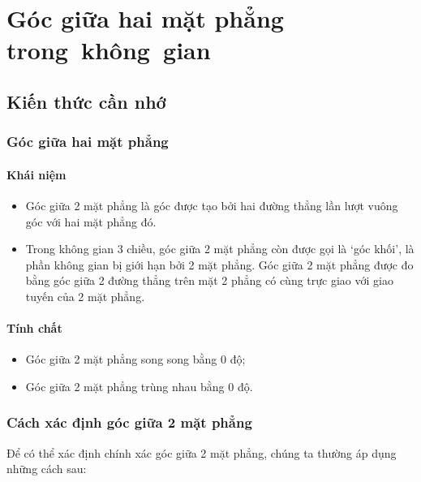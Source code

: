 \setcounter{section}{29}
\setcounter{ex}{0}
\section{Góc giữa hai mặt phẳng trong~không~gian}
\subsection{Kiến thức cần nhớ}
\begin{khung}
\subsubsection{Góc giữa hai mặt phẳng}
	\paragraph{Khái niệm}
	\begin{itemize}
		\item Góc giữa 2 mặt phẳng là góc được tạo bởi hai đường thẳng lần lượt vuông góc với hai mặt phẳng đó.
		\item Trong không gian 3 chiều, góc giữa 2 mặt phẳng còn được gọi là \lq góc khối\rq, là phần không gian bị giới hạn bởi 2 mặt phẳng. Góc giữa 2 mặt phẳng được đo bằng góc giữa 2 đường thẳng trên mặt 2 phẳng có cùng trực giao với giao tuyến của 2 mặt phẳng.
		\end{itemize}
	\paragraph{Tính chất}
			\begin{itemize}
				\item Góc giữa 2 mặt phẳng song song bằng $ 0 $ độ;
				\item Góc giữa 2 mặt phẳng trùng nhau bằng $ 0 $ độ.
			\end{itemize}
\subsubsection{Cách xác định góc giữa 2 mặt phẳng}
Để có thể xác định chính xác góc giữa 2 mặt phẳng, chúng ta thường áp dụng những cách sau:
 

\end{khung}
